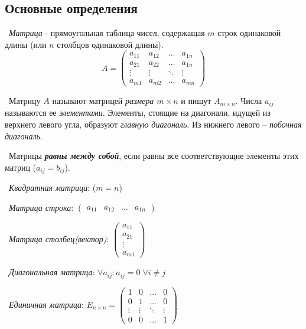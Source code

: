 \subsection*{Основные определения}

\noindent \textasteriskcentered~\textit{Матрица} - прямоугольная таблица чисел, содержащая $m$ строк одинаковой длины (или $n$ столбцов одинаковой длины).
\[
A = 
\begin{pmatrix}
    a_{11} & a_{12} & \dots & a_{1n} \\
    a_{21} & a_{22} & \dots & a_{1n} \\
    \vdots & \vdots & \ddots & \vdots \\
    a_{m1} & a_{m2} & \dots & a_{mn}
\end{pmatrix}
\]

\noindent \textasteriskcentered~Матрицу $A$ называют матрицей \textit{размера $m \times n$} и пишут $A_{m \times n}$. 
Числа $a_{ij}$ называются ее \textit{элементами}. 
Элементы, стоящие на диагонали, идущей из верхнего левого угла, образуют \textit{главную диагональ}. Из нижнего левого -- \textit{побочная диагональ}.

\smallskip
\noindent \textasteriskcentered~Матрицы \textbf{\textit{равны между собой}}, если равны все соответствующие элементы этих матриц ($a_{ij} = b_{ij}$).

\smallskip
\noindent \textasteriskcentered~\textit{Квадратная матрица}: ($m = n$)

\smallskip
\noindent \textasteriskcentered~\textit{Матрица строка}:
$\begin{pmatrix}
    a_{11} & a_{12} & \dots & a_{1n}
\end{pmatrix}$

\smallskip
\noindent \textasteriskcentered~\textit{Матрица столбец(вектор)}: 
$\begin{pmatrix}
    a_{11} \\ 
    a_{21} \\
    \vdots \\
    a_{m1}
\end{pmatrix}$

\smallskip
\noindent \textasteriskcentered~\textit{Диагональная матрица}: 
$\forall a_{ij} : a_{ij} = 0 \; \forall i \neq j$

\smallskip
\noindent \textasteriskcentered~\textit{Единичная матрица}:
$E_{n \times n} = 
\begin{pmatrix}
    1 & 0 & \dots & 0 \\
    0 & 1 & \dots & 0 \\
    \vdots & \vdots & \ddots & \vdots \\
    0 & 0 & \dots & 1
\end{pmatrix}
$

